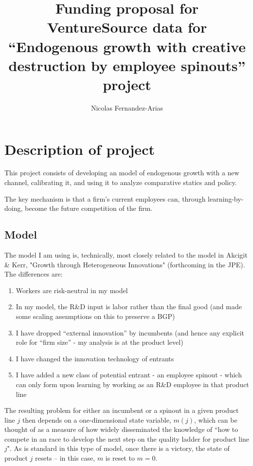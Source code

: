 \documentclass[12pt,english]{article}
\theoremstyle{remark}
\begin{document}
	
\title{Funding proposal for VentureSource data for ``Endogenous growth with creative destruction by employee spinouts'' project}
\author{Nicolas Fernandez-Arias}
\maketitle

\section{Description of project}

This project consists of developing an model of endogenous growth with a new channel, calibrating it, and using it to analyze comparative statics and policy. 

The key mechanism is that a firm's current employees can, through learning-by-doing, become the future competition of the firm. 

\subsection{Model}

The model I am using is, technically, most closely related to the model in Akcigit \& Kerr, "Growth through Heterogeneous Innovations" (forthcoming in the JPE). The differences are:
\begin{enumerate}
	\item Workers are risk-neutral in my model
	\item In my model, the R\&D input is labor rather than the final good (and made some scaling assumptions on this to preserve a BGP)
	\item I have dropped ``external innovation'' by incumbents (and hence any explicit role for ``firm size'' - my analysis is at the product level)
	\item I have changed the innovation technology of entrants
	\item I have added a new class of potential entrant - an employee spinout - which can only form upon learning by working as an R\&D employee in that product line
\end{enumerate}

The resulting problem for either an incumbent or a spinout in a given product line $j$ then depends on a one-dimensional state variable, $m(j)$, which can be thought of as a measure of how widely disseminated the knowledge of ``how to compete in an race to develop the next step on the quality ladder for product line $j$". As is standard in this type of model, once there is a victory, the state of product $j$ resets -- in this case, $m$ is reset to $m = 0$. 
\end{document}
